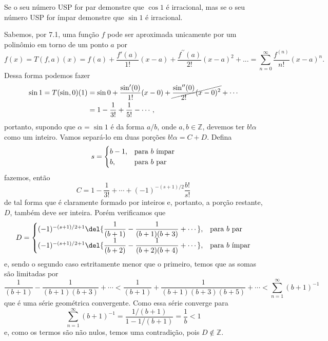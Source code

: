 \documentclass{IMTexam}
\author{Isabella B. Amaral}
\date{20 de maio}
\begin{document}
    \maketitle

    \begin{questions}
        \question Se o seu número USP for par demonstre que $ \cos 1 $ é
        irracional, mas se o seu número USP for ímpar demonstre que $ \sin 1 $ é
        irracional.

        \begin{solution}
            Sabemos, por 7.1, uma função $ f $ pode ser aproximada unicamente por um polinômio em
            torno de um ponto $ a $ por
            \[ f(x) = T(f, a)(x) = f(a) + \dfrac{f'(a)}{1!}(x - a) +
            \dfrac{f^{\prime\prime}(a)}{2!}(x - a)^2 + ... = \sum_{n = 0}^\infty
            \dfrac{f^{(n)}}{n!}(x - a)^n. \]
            Dessa forma podemos fazer
            \begin{align*}
                \sin 1 = T(\sin, 0)(1) &= \sin 0 +
                \dfrac{\sin'(0)}{1!}(x - 0) +
                \cancel{\dfrac{\sin^{\prime\prime}(0)}{2!}(x - 0)^2} + \cdots\\
                &= 1 - \dfrac{1}{3!} + \dfrac{1}{5!} - \cdots,
            \end{align*}
            portanto, supondo que $ \alpha=\sin 1 $ é da forma $ a/b $, onde $
            a,b\in\mathbb{Z} $, devemos ter $b!\alpha$ como um inteiro. Vamos
            separá-lo em duas porções $b!\alpha = C+D$. Defina
            \[s=\begin{cases}
                b-1,&\textup{para $b$ ímpar}\\
                b,&\textup{para $b$ par}
            \end{cases}\]
            fazemos, então
            \[ C =  1 - \dfrac{1}{3!} + \cdots + (-1)^{-(s+1)/2}\dfrac{b!}{s!} \]
            de tal forma que é claramente formado por inteiros e, portanto, a
            porção restante, $D$, também deve ser inteira.
            Porém verificamos que
            \[ D = \begin{cases}
                (-1)^{-(s+1)/2+1}\del{\dfrac{1}{(b+1)}-\dfrac{1}{(b+1)(b+3)}+\cdots},&\textup{para $b$ par}\\
                (-1)^{-(s+1)/2+1}\del{\dfrac{1}{(b+2)}-\dfrac{1}{(b+2)(b+4)}+\cdots},&\textup{para $b$ ímpar}
            \end{cases}\]
            e, sendo o segundo caso estritamente menor que o primeiro, temos que as somas são limitadas por
            \[ \dfrac{1}{(b+1)}-\dfrac{1}{(b+1)(b+3)}+\cdots <
            \dfrac{1}{(b+1)}+\dfrac{1}{(b+1)(b+3)(b+5)}+\cdots <
            \sum_{n=1}^\infty (b+1)^{-1} \]
            que é uma série geométrica convergente.
            Como essa série converge para
            \[ \sum_{n=1}^\infty (b+1)^{-1} = \dfrac{1/(b+1)}{1-1/(b+1)} = \dfrac{1}{b} < 1 \]
            e, como os termos são não nulos, temos uma contradição, pois $D\notin \mathbb{Z}$.


\end{solution}
\end{questions}
\end{document}
